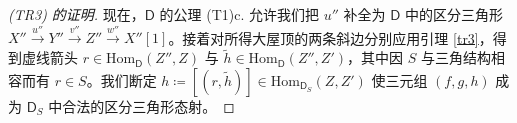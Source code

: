 \begin{proof}[(\textup{TR3}) 的证明]
	现在，$\mathsf{D}$ 的公理 (T1)c. 允许我们把 $u''$ 补全为 $\mathsf{D}$ 中的区分三角形 $X''\xrightarrow{u''}Y''\xrightarrow{v''}Z''\xrightarrow{w''}X''[1]$。接着对所得大屋顶的两条斜边分别应用引理 \ref{tr3}，得到虚线箭头 $r\in\text{Hom}_\mathsf{D}(Z'',Z)$ 与 $\tilde{h}\in\text{Hom}_\mathsf{D}(Z'',Z')$，其中因 $S$ 与三角结构相容而有 $r\in S$。我们断定 $h\coloneqq[(r,\tilde{h})]\in\text{Hom}_{\mathsf{D}_S}(Z,Z')$ 使三元组 $(f,g,h)$ 成为 $\mathsf{D}_S$ 中合法的区分三角形态射。
\end{proof}

